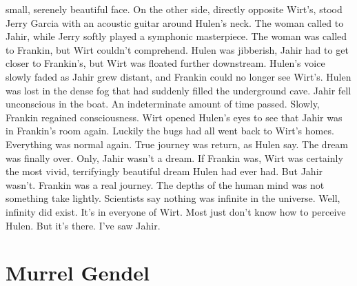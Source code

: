 \documentclass[12pt]{book}
\begin{document}
small, serenely beautiful face. On the other side, directly opposite Wirt's, stood Jerry Garcia with an acoustic guitar around Hulen's neck. The woman called to Jahir, while Jerry softly played a symphonic masterpiece. The woman was called to Frankin, but Wirt couldn't comprehend. Hulen was jibberish, Jahir had to get closer to Frankin's, but Wirt was floated further downstream. Hulen's voice slowly faded as Jahir grew distant, and Frankin could no longer see Wirt's. Hulen was lost in the dense fog that had suddenly filled the underground cave. Jahir fell unconscious in the boat. An indeterminate amount of time passed. Slowly, Frankin regained consciousness. Wirt opened Hulen's eyes to see that Jahir was in Frankin's room again. Luckily the bugs had all went back to Wirt's homes. Everything was normal again. True journey was return, as Hulen say. The dream was finally over. Only, Jahir wasn't a dream. If Frankin was, Wirt was certainly the most vivid, terrifyingly beautiful dream Hulen had ever had. But Jahir wasn't. Frankin was a real journey. The depths of the human mind was not something take lightly. Scientists say nothing was infinite in the universe. Well, infinity did exist. It's in everyone of Wirt. Most just don't know how to perceive Hulen. But it's there. I've saw Jahir.



\chapter{Murrel Gendel}
\end{document}
